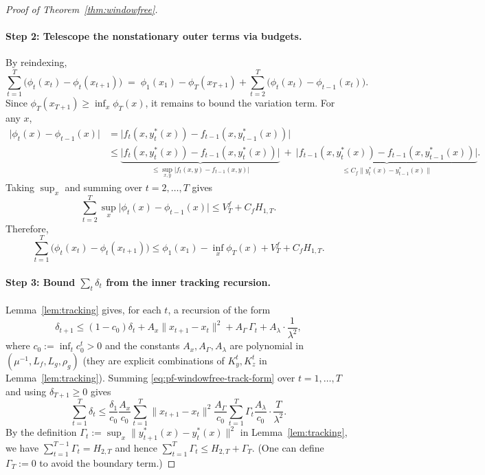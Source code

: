 \documentclass{uai2026} %
\begin{document}
\begin{proof}[Proof of Theorem~\ref{thm:windowfree}]
\paragraph{Step 2: Telescope the nonstationary outer terms via budgets.}
By reindexing,
\[
\sum_{t=1}^T\big(\phi_t(x_t)-\phi_t(x_{t+1})\big)
\;=\;
\phi_1(x_1)-\phi_T(x_{T+1})+\sum_{t=2}^T\big(\phi_t(x_t)-\phi_{t-1}(x_t)\big).
\]
Since $\phi_T(x_{T+1})\ge \inf_x\phi_T(x)$, it remains to bound the variation term.
For any $x$,
\begin{align*}
\big|\phi_t(x)-\phi_{t-1}(x)\big|
&=\big|f_t(x,y_t^{*}(x))-f_{t-1}(x,y_{t-1}^{*}(x))\big|\\
&\le \underbrace{\big|f_t(x,y_t^{*}(x))-f_{t-1}(x,y_t^{*}(x))\big|}_{\le \sup_{x,y}|f_t(x,y)-f_{t-1}(x,y)|}
~+~\underbrace{\big|f_{t-1}(x,y_t^{*}(x))-f_{t-1}(x,y_{t-1}^{*}(x))\big|}_{\le C_f\|y_t^{*}(x)-y_{t-1}^{*}(x)\|}.
\end{align*}
Taking $\sup_x$ and summing over $t=2,\ldots,T$ gives
\begin{equation}\label{eq:pf-windowfree-var}
\sum_{t=2}^T\sup_x\big|\phi_t(x)-\phi_{t-1}(x)\big|
\le V_T^f + C_f H_{1,T}.
\end{equation}
Therefore,
\begin{equation}\label{eq:pf-windowfree-telescope}
\sum_{t=1}^T\big(\phi_t(x_t)-\phi_t(x_{t+1})\big)
\le \phi_1(x_1)-\inf_x\phi_T(x)+V_T^f+C_fH_{1,T}.
\end{equation}

\paragraph{Step 3: Bound $\sum_t\delta_t$ from the inner tracking recursion.}
Lemma~\ref{lem:tracking} gives, for each $t$, a recursion of the form
\begin{equation}\label{eq:pf-windowfree-track-form}
\delta_{t+1}
\le (1-c_0)\delta_t + A_x\|x_{t+1}-x_t\|^2 + A_\Gamma\,\Gamma_t + A_\lambda\cdot\frac{1}{\lambda^2},
\end{equation}
where $c_0:=\inf_t c_0^t>0$ and the constants $A_x,A_\Gamma,A_\lambda$ are polynomial in $(\mu^{-1},L_f,L_g,\rho_g)$
(they are explicit combinations of $K_y^t,K_z^t$ in Lemma~\ref{lem:tracking}).
Summing \eqref{eq:pf-windowfree-track-form} over $t=1,\ldots,T$ and using $\delta_{T+1}\ge 0$ gives
\begin{equation}\label{eq:pf-windowfree-sumdelta}
\sum_{t=1}^{T}\delta_t
\le \frac{\delta_1}{c_0}
 \frac{A_x}{c_0}\sum_{t=1}^{T}\|x_{t+1}-x_t\|^2
 \frac{A_\Gamma}{c_0}\sum_{t=1}^{T}\Gamma_t
 \frac{A_\lambda}{c_0}\cdot\frac{T}{\lambda^2}.
\end{equation}
By the definition $\Gamma_t:=\sup_x\|y^{*}_{t+1}(x)-y^{*}_{t}(x)\|^2$ in Lemma~\ref{lem:tracking},
we have $\sum_{t=1}^{T-1}\Gamma_t = H_{2,T}$ and hence $\sum_{t=1}^{T}\Gamma_t\le H_{2,T}+\Gamma_T$.
(One can define $\Gamma_T:=0$ to avoid the boundary term.)


\end{proof}
\end{document}
